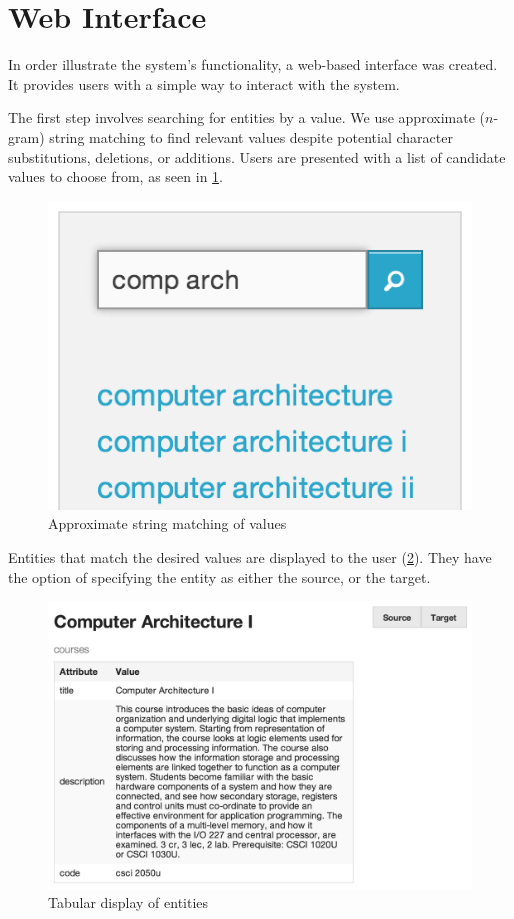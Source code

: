 \section{Web Interface}
\label{sec:web-interface}
	In order illustrate the system's functionality, a web-based interface was created.  It provides users with a simple way to interact with the system.
	
	The first step involves searching for entities by a value.  We use approximate (\(n\)-gram) string matching to find relevant values despite potential character substitutions, deletions, or additions.  Users are presented with a list of candidate values to choose from, as seen in \cref{fig:webui-step-1}.
	
	\begin{figure}[H]
		\centering
		\includegraphics[scale=0.5]{figures/images/step-1}
		
		\caption{Approximate string matching of values}
		\label{fig:webui-step-1}
	\end{figure}
	
	Entities that match the desired values are displayed to the user (\cref{fig:webui-step-2}).  They have the option of specifying the entity as either the source, or the target.
	
	\begin{figure}[H]
		\centering
		\includegraphics[scale=0.5]{figures/images/step-2}
		
		\caption{Tabular display of entities}
		\label{fig:webui-step-2}
	\end{figure}
	
